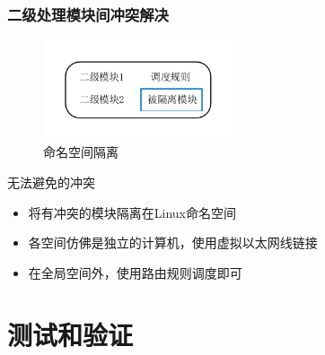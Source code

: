 \documentclass{beamer}
\begin{document}
\begin{frame}
  \frametitle{二级处理模块间冲突解决}
  \begin{figure}
    \vspace{-4em}
    \includegraphics[width=0.5\textwidth]{figs/19-netns.pdf}
    \vspace{-2em}
    \caption{命名空间隔离}
  \end{figure}
  \vspace{-1em}

  \begin{block}{无法避免的冲突}
    \begin{itemize}
    \item 将有冲突的模块隔离在Linux命名空间
    \item 各空间仿佛是独立的计算机，使用虚拟以太网线链接
    \item 在全局空间外，使用路由规则调度即可
    \end{itemize}
  \end{block}
\end{frame}

\section{测试和验证}
\end{document}
